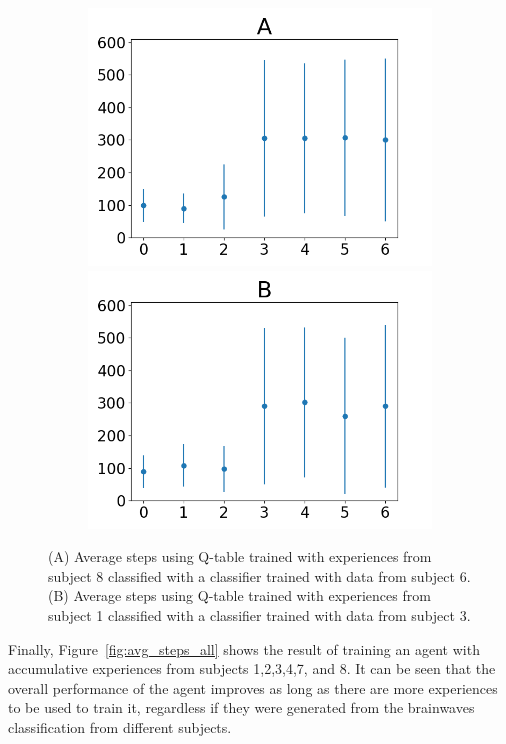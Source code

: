 \documentclass[journal]{IEEEtran}
\begin{document}
{{\begin{figure}[h!]
\begin{subfigure}{0.5\textwidth}
\includegraphics[scale=0.27]{Images/Average_steps/Ax.png}
\includegraphics[scale=0.27]{Images/Average_steps/Bx.png}
\end{subfigure}
\caption{(A) Average steps using Q-table trained with experiences from subject 8 classified with a classifier trained with data from subject 6.  (B) Average steps using Q-table trained with experiences from subject 1 classified with a classifier trained with data from subject 3.}
\label{fig:transferlearning}
\end{figure}

Finally, Figure~\ref{fig:avg_steps_all} shows the result of training an agent with accumulative experiences from subjects 1,2,3,4,7, and 8.  It can be seen that the overall performance of the agent improves as long as there are more experiences to be used to train it, regardless if they were generated from the brainwaves classification from different subjects.  


}}
\end{document}
